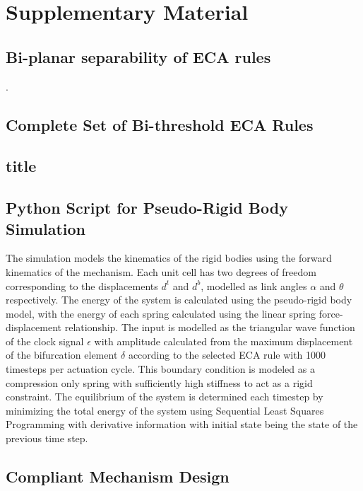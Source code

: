 \appendix
\section{Supplementary Material}
\subsection*{Bi-planar separability of ECA rules}
\label{sec:Bi-planar separability of ECA rules}.
\subsection*{Complete Set of Bi-threshold ECA Rules}
\label{sec:Complete Set of Bi-threshold ECA Rules}
\subsection*{title}


\subsection*{Python Script for Pseudo-Rigid Body Simulation}
The simulation models the kinematics of the rigid bodies using the forward kinematics of the mechanism. Each unit cell has two degrees of freedom corresponding to the displacements \( d^t \) and \( d^b \), modelled as link angles \(\alpha\) and \(\theta\) respectively. The energy of the system is calculated using the pseudo-rigid body model, with the energy of each spring calculated using the linear spring force-displacement relationship. The input is modelled as the triangular wave function of the clock signal \(\epsilon\) with amplitude calculated from the maximum displacement of the bifurcation element \( \delta \) according to the selected ECA rule with 1000 timesteps per actuation cycle. This boundary condition is modeled as a compression only spring with sufficiently high stiffness to act as a rigid constraint. The equilibrium of the system is determined each timestep by minimizing the total energy of the system using Sequential Least Squares Programming with derivative information with initial state being the state of the previous time step. 
\label{sec:Python Script for Pseudo-Rigid Body Simulation}


\subsection*{Compliant Mechanism Design}
\label{sec:Compliant Mechanism Design}


